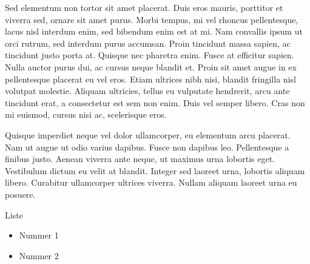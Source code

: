 Sed elementum non tortor sit amet placerat. Duis eros mauris, porttitor et viverra sed, ornare sit amet purus. Morbi tempus, mi vel rhoncus pellentesque, lacus nisl interdum enim, sed bibendum enim est at mi. Nam convallis ipsum ut orci rutrum, sed interdum purus accumsan. Proin tincidunt massa sapien, ac tincidunt justo porta at. Quisque nec pharetra enim. Fusce at efficitur sapien. Nulla auctor purus dui, ac cursus neque blandit et. Proin sit amet augue in ex pellentesque placerat eu vel eros. Etiam ultrices nibh nisi, blandit fringilla nisl volutpat molestie. Aliquam ultricies, tellus eu vulputate hendrerit, arcu ante tincidunt erat, a consectetur est sem non enim. Duis vel semper libero. Cras non mi euismod, cursus nisi ac, scelerisque eros.

Quisque imperdiet neque vel dolor ullamcorper, eu elementum arcu placerat. Nam ut augue ut odio varius dapibus. Fusce non dapibus leo. Pellentesque a finibus justo. Aenean viverra ante neque, ut maximus urna lobortis eget. Vestibulum dictum eu velit at blandit. Integer sed laoreet urna, lobortis aliquam libero. Curabitur ullamcorper ultrices viverra. Nullam aliquam laoreet urna eu posuere.

Liste
\begin{itemize}
\item Nummer 1
\item Nummer 2
\end{itemize}




